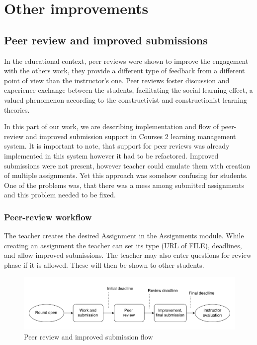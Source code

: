 \chapter{Other improvements}

\section{Peer review and improved submissions}

In the educational context, peer reviews were shown to improve the engagement with the others work, they provide a different type of feedback from a different point of view than the instructor’s one. Peer reviews foster discussion and experience exchange between the students, facilitating the social learning effect, a valued phenomenon according to the constructivist and constructionist learning theories. \cite{peerreview}


In this part of our work, we are describing implementation and flow of peer-review and improved submission support in Courses 2 learning management system. It is important to note, that support for peer reviews was already implemented in this system however it had to be refactored. Improved submissions were not present, however teacher could emulate them with creation of multiple assignments. Yet this approach was somehow confusing for students. One of the problems was, that there was a mess among submitted assignments and this problem needed to be fixed.


\subsection{Peer-review workflow}

The teacher creates the desired Assignment in the Assignments module. While creating an assignment the teacher can set its type (URL of FILE), deadlines, and allow improved submissions. The teacher may also enter questions for review phase if it is allowed. These will then be shown to other students.

\begin{figure}[h]
    \centering
    \includegraphics[width=\textwidth]{images/peerreview.png}
    \caption{Peer review and improved submission flow}
    \label{fig:improved_submissions}
\end{figure}

